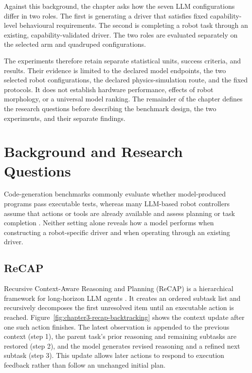 Against this background, the chapter asks how the seven LLM configurations
differ in two roles. The first is generating a driver that satisfies fixed
capability-level behavioural requirements. The second is completing a robot
task through an existing, capability-validated driver. The two roles are
evaluated separately on the selected arm and quadruped configurations.

The experiments therefore retain separate statistical units, success
criteria, and results. Their evidence is limited to the declared model
endpoints, the two selected robot configurations, the declared
physics-simulation route, and the fixed protocols. It does not establish
hardware performance, effects of robot morphology, or a universal model
ranking. The remainder of the chapter defines the research questions before
describing the benchmark design, the two experiments, and their separate
findings.



\section[Background and Research Questions]{Background and Research Questions}

Code-generation benchmarks commonly evaluate whether model-produced programs
pass executable tests, whereas many LLM-based robot controllers assume that
actions or tools are already available and assess planning or task completion
\citep{chen2021codex,jimenez2024swebench,ahn2022saycan,
singh2023progprompt}. Neither setting alone reveals how a model performs when
constructing a robot-specific driver and when operating through an existing
driver.

\subsection[ReCAP]{ReCAP}
\label{sec:recap}

Recursive Context-Aware Reasoning and Planning (ReCAP) is a hierarchical
framework for long-horizon LLM agents \citep{zhang2025recap}. It creates an
ordered subtask list and recursively decomposes the first unresolved item until
an executable action is reached.
Figure~\ref{fig:chapter3-recap-backtracking} shows the context update after one
such action finishes. The latest observation is appended to the previous
context (step 1), the parent task's prior reasoning and remaining subtasks are
restored (step 2), and the model generates revised reasoning and a refined next
subtask (step 3). This update allows later actions to respond to execution
feedback rather than follow an unchanged initial plan.

